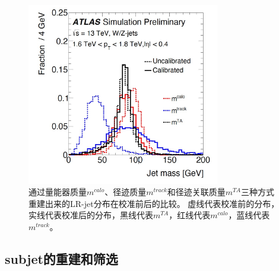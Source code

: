 \begin{figure}
  \begin{center}
    \includegraphics[width=0.75\textwidth]{figuresXbb/LRMASS.jpg}
  \end{center}
  \caption{
  通过量能器质量$m^{calo}$、径迹质量$m^{track}$和径迹关联质量$m^{TA}$三种方式重建出来的LR-jet分布在校准前后的比较。
  虚线代表校准前的分布，实线代表校准后的分布，黑线代表$m^{TA}$，红线代表$m^{calo}$，蓝线代表$m^{track}$。
  }
    \label{fig:LRMASS}
\end{figure}



\subsection{subjet的重建和筛选}
\label{sec:XbbORSR}

